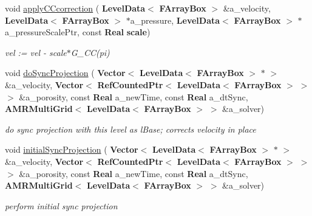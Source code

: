 \begin{DoxyCompactItemize}
\item 
void \hyperlink{class_projector_a760ab8ccacded1496730c00c952ee957}{apply\+C\+Ccorrection} (\textbf{ Level\+Data}$<$ \textbf{ F\+Array\+Box} $>$ \&a\+\_\+velocity, \textbf{ Level\+Data}$<$ \textbf{ F\+Array\+Box} $>$ $\ast$a\+\_\+pressure, \textbf{ Level\+Data}$<$ \textbf{ F\+Array\+Box} $>$ $\ast$a\+\_\+pressure\+Scale\+Ptr, const \textbf{ Real} \textbf{ scale})
\begin{DoxyCompactList}\small\item\em vel \+:= vel -\/ scale$\ast$\+G\+\_\+\+CC(pi) \end{DoxyCompactList}\item 
\mbox{\label{class_projector_a554b357b8e988ae99a7d53be9725a31f}} 
void \hyperlink{class_projector_a554b357b8e988ae99a7d53be9725a31f}{do\+Sync\+Projection} (\textbf{ Vector}$<$ \textbf{ Level\+Data}$<$ \textbf{ F\+Array\+Box} $>$ $\ast$ $>$ \&a\+\_\+velocity, \textbf{ Vector}$<$ \textbf{ Ref\+Counted\+Ptr}$<$ \textbf{ Level\+Data}$<$ \textbf{ F\+Array\+Box} $>$ $>$ $>$ \&a\+\_\+porosity, const \textbf{ Real} a\+\_\+new\+Time, const \textbf{ Real} a\+\_\+dt\+Sync, \textbf{ A\+M\+R\+Multi\+Grid}$<$ \textbf{ Level\+Data}$<$ \textbf{ F\+Array\+Box} $>$ $>$ \&a\+\_\+solver)
\begin{DoxyCompactList}\small\item\em do sync projection with this level as l\+Base; corrects velocity in place \end{DoxyCompactList}\item 
\mbox{\label{class_projector_ab0637d2061d3d7cbc885366c4cf9ace4}} 
void \hyperlink{class_projector_ab0637d2061d3d7cbc885366c4cf9ace4}{initial\+Sync\+Projection} (\textbf{ Vector}$<$ \textbf{ Level\+Data}$<$ \textbf{ F\+Array\+Box} $>$ $\ast$ $>$ \&a\+\_\+velocity, \textbf{ Vector}$<$ \textbf{ Ref\+Counted\+Ptr}$<$ \textbf{ Level\+Data}$<$ \textbf{ F\+Array\+Box} $>$ $>$ $>$ \&a\+\_\+porosity, const \textbf{ Real} a\+\_\+new\+Time, const \textbf{ Real} a\+\_\+dt\+Sync, \textbf{ A\+M\+R\+Multi\+Grid}$<$ \textbf{ Level\+Data}$<$ \textbf{ F\+Array\+Box} $>$ $>$ \&a\+\_\+solver)
\begin{DoxyCompactList}\small\item\em perform initial sync projection \end{DoxyCompactList}\item 
\mbox{\label{class_projector_a6e07f1d02ca8606d9672e4005ebfe4a7}} 

\end{DoxyCompactItemize}

